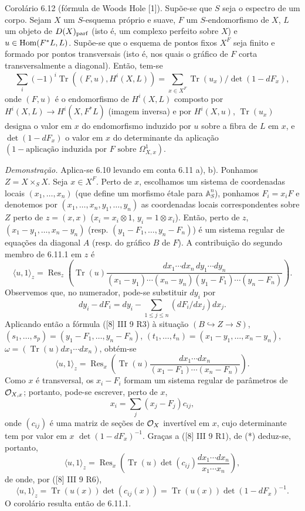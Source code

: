 \begin{statement}{Corolário 6.12}
(fórmula de Woods Hole [1]). Supõe-se que $S$ seja o espectro de um corpo. Sejam $X$ um $S$-esquema próprio e suave, $F$ um $S$-endomorfismo de $X$, $L$ um objeto de $D(X)_{\mathrm{parf}}$ (isto é, um complexo perfeito sobre $X$) e $u\in\operatorname{Hom}(F^*L,L)$. Supõe-se que o esquema de pontos fixos $X^F$ seja finito e formado por pontos transversais (isto é, nos quais o gráfico de $F$ corta transversalmente a diagonal). Então, tem-se
\[
\sum_i(-1)^i\operatorname{Tr}((F,u),H^i(X,L))=
\sum_{x\in X^F}\operatorname{Tr}(u_x)/\det(1-dF_x),
\]
onde $(F,u)$ é o endomorfismo de $H^i(X,L)$ composto por $H^i(X,L)\to H^i(X,F^*L)$ (imagem inversa) e por $H^i(X,u)$, $\operatorname{Tr}(u_x)$ designa o valor em $x$ do endomorfismo induzido por $u$ sobre a fibra de $L$ em $x$, e $\det(1-dF_x)$ o valor em $x$ do determinante da aplicação $(1-\text{aplicação induzida por }F\text{ sobre }\Omega^1_{X,x})$.

\emph{Demonstração.} Aplica-se 6.10 levando em conta 6.11 a), b). Ponhamos $Z=X\times_S X$. Seja $x\in X^F$. Perto de $x$, escolhamos um sistema de coordenadas locais $(x_1,\ldots,x_n)$ (que define um morfismo étale para $\mathbb A_S^n$), ponhamos $F_i=x_iF$ e denotemos por $(x_1,\ldots,x_n,y_1,\ldots,y_n)$ as coordenadas locais correspondentes sobre $Z$ perto de $z=(x,x)$ ($x_i=x_i\otimes1$, $y_i=1\otimes x_i$). Então, perto de $z$, $(x_1-y_1,\ldots,x_n-y_n)$ (resp. $(y_1-F_1,\ldots,y_n-F_n)$) é um sistema regular de equações da diagonal $A$ (resp. do gráfico $B$ de $F$). A contribuição do segundo membro de 6.11.1 em $z$ é
\[
\langle u,1\rangle_z=
\operatorname{Res}_z\left(\operatorname{Tr}(u)\frac{dx_1\cdots dx_n\,dy_1\cdots dy_n}{(x_1-y_1)\cdots(x_n-y_n)(y_1-F_1)\cdots(y_n-F_n)}\right).
\]
Observemos que, no numerador, pode-se substituir $dy_i$ por
\[
dy_i-dF_i=dy_i-\sum_{1\le j\le n}(dF_i/dx_j)dx_j.
\]
Aplicando então a fórmula ([8] III 9 R3) à situação $(B\hookrightarrow Z\to S)$, $(s_1,\ldots,s_p)=(y_1-F_1,\ldots,y_n-F_n)$, $(t_1,\ldots,t_n)=(x_1-y_1,\ldots,x_n-y_n)$, $\omega=(\operatorname{Tr}(u)dx_1\cdots dx_n)$, obtém-se
\begin{equation}
\tag{*}
\langle u,1\rangle_z=
\operatorname{Res}_x\left(\operatorname{Tr}(u)\frac{dx_1\cdots dx_n}{(x_1-F_1)\cdots(x_n-F_n)}\right).
\end{equation}
Como $x$ é transversal, os $x_i-F_i$ formam um sistema regular de parâmetros de $\mathcal{O}_{X,x}$; portanto, pode-se escrever, perto de $x$,
\[
x_i=\sum_j(x_j-F_j)c_{ij},
\]
onde $(c_{ij})$ é uma matriz de seções de $\mathcal{O}_X$ invertível em $x$, cujo determinante tem por valor em $x$ $\det(1-dF_x)^{-1}$. Graças a ([8] III 9 R1), de (*) deduz-se, portanto,
\[
\langle u,1\rangle_z=\operatorname{Res}_x\left(\operatorname{Tr}(u)\det(c_{ij})\frac{dx_1\cdots dx_n}{x_1\cdots x_n}\right),
\]
de onde, por ([8] III 9 R6),
\[
\langle u,1\rangle_z=\operatorname{Tr}(u(x))\det(c_{ij}(x))=\operatorname{Tr}(u(x))\det(1-dF_x)^{-1}.
\]
O corolário resulta então de 6.11.1.
\end{statement}

